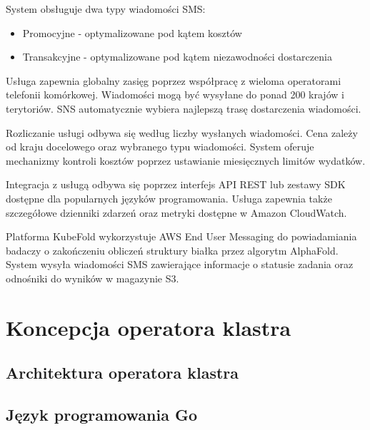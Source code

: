 System obsługuje dwa typy wiadomości SMS:
\begin{itemize}
    \item Promocyjne - optymalizowane pod kątem kosztów
    \item Transakcyjne - optymalizowane pod kątem niezawodności dostarczenia
\end{itemize}

Usługa zapewnia globalny zasięg poprzez współpracę z wieloma operatorami telefonii komórkowej.
Wiadomości mogą być wysyłane do ponad 200 krajów i terytoriów.
SNS automatycznie wybiera najlepszą trasę dostarczenia wiadomości.

Rozliczanie usługi odbywa się według liczby wysłanych wiadomości.
Cena zależy od kraju docelowego oraz wybranego typu wiadomości.
System oferuje mechanizmy kontroli kosztów poprzez ustawianie miesięcznych limitów wydatków.

Integracja z usługą odbywa się poprzez interfejs API REST lub zestawy SDK dostępne dla popularnych języków programowania.
Usługa zapewnia także szczegółowe dzienniki zdarzeń oraz metryki dostępne w Amazon CloudWatch.

Platforma KubeFold wykorzystuje AWS End User Messaging do powiadamiania badaczy o zakończeniu obliczeń struktury białka przez algorytm AlphaFold.
System wysyła wiadomości SMS zawierające informacje o statusie zadania oraz odnośniki do wyników w magazynie S3.

\section{Koncepcja operatora klastra}

\subsection{Architektura operatora klastra}

\subsection{Język programowania Go}